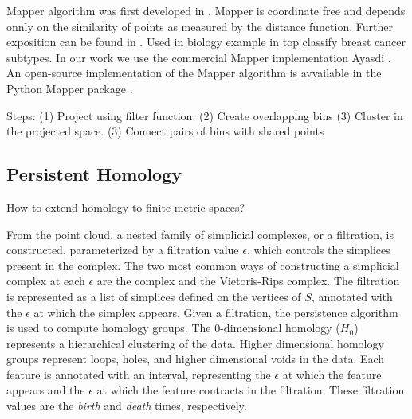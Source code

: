 Mapper algorithm was first developed in \cite{Singh:2007ve}.
Mapper is coordinate free and depends onnly on the similarity of points as measured by the distance function.
Further exposition can be found in \cite{Lum:2013cz}.
Used in biology example in \cite{Nicolau:2011} top classify breast cancer subtypes.
In our work we use the commercial Mapper implementation Ayasdi \cite{AyasdiIris:2015}.
An open-source implementation of the Mapper algorithm is avvailable in the Python Mapper package \cite{Mullner:2013}.

Steps:
(1) Project using filter function.
(2) Create overlapping bins
(3) Cluster in the projected space.
(3) Connect pairs of bins with shared points

\subsection{Persistent Homology}
\label{background:ss:persistent_homology}

How to extend homology to finite metric spaces?

From the point cloud, a nested family of simplicial complexes, or a filtration, is constructed, parameterized by a filtration value $\epsilon$, which controls the simplices present in the complex.
The two most common ways of constructing a simplicial complex at each $\epsilon$ are the \Cech complex and the Vietoris-Rips complex.
The filtration is represented as a list of simplices defined on the vertices of $S$, annotated with the $\epsilon$ at which the simplex appears.
Given a filtration, the persistence algorithm is used to compute homology groups.
The $0$-dimensional homology ($H_0$) represents a hierarchical clustering of the data.
Higher dimensional homology groups represent loops, holes, and higher dimensional voids in the data.
Each feature is annotated with an interval, representing the $\epsilon$ at which the feature appears and the $\epsilon$ at which the feature contracts in the filtration.
These filtration values are the \emph{birth} and \emph{death} times, respectively.



